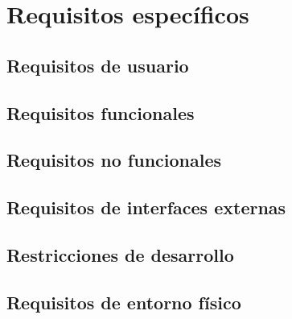 \section{Requisitos específicos}\label{sec:requirements}

\subsection{Requisitos de usuario}\label{ssec:user-req}

\subsection{Requisitos funcionales}\label{ssec:functional-req}

\subsection{Requisitos no funcionales}\label{ssec:non-functional-req}

\subsection{Requisitos de interfaces externas}\label{ssec:external-if-req}

\subsection{Restricciones de desarrollo}\label{ssec:dev-restrictions}

\subsection{Requisitos de entorno físico}\label{ssec:phisical-req}

